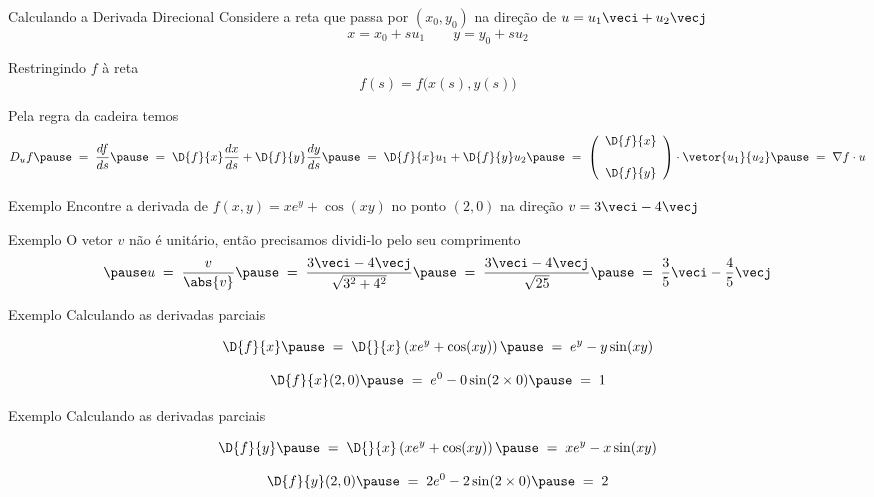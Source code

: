 \begin{frame}{Calculando a Derivada Direcional}
  Considere a reta que passa por \((x_0, y_0)\)
  \pause
  na direção de \(u=u_1\veci+u_2\vecj\)
  \pause
  \[
    x = x_0 + su_1 \qquad
    y = y_0 + su_2
  \]

  Restringindo $f$ à reta
  \[
    f(s) = f\big(x(s), y(s)\big)
  \]

  \pause
  Pela regra da cadeira temos
  \[
    D_u f
    \pause
    \;=\; \frac{df}{ds}
    \pause
    \;=\; \D{f}{x}\frac{dx}{ds} + \D{f}{y}\frac{dy}{ds}
    \pause
    \;=\; \D{f}{x}u_1 + \D{f}{y}u_2
    \pause
    \;=\; \left(\begin{array}{c} \D{f}{x} \\[5mm] \D{f}{y} \end{array}\right)
      \cdot \vetor{u_1}{u_2}
    \pause
    \;=\; \nabla f \cdot u
  \]
\end{frame}

\addtocounter{exemplo}{1}
\begin{frame}{Exemplo \theexemplo}
  Encontre a derivada de \(f(x, y) = xe^y + \cos(xy)\)
  no ponto \((2, 0)\)
  na direção \(v=3\veci-4\vecj\)
\end{frame}

\begin{frame}{Exemplo \theexemplo}
  O vetor $v$ não é unitário,
  \pause
  então precisamos dividi-lo pelo seu
  comprimento
  \[
    \pause
    u
    \;=\; \frac{v}{\abs{v}}
    \pause
    \;=\; \frac{3\veci-4\vecj}{\sqrt{3^2+4^2}}
    \pause
    \;=\; \frac{3\veci-4\vecj}{\sqrt{25}}
    \pause
    \;=\; \frac{3}{5}\veci - \frac{4}{5}\vecj
  \]
\end{frame}

\begin{frame}{Exemplo \theexemplo}
  Calculando as derivadas parciais

  \pause
  \[
    \D{f}{x}
    \pause
    \;=\;  \D{}{x}\left(xe^y + \cos(xy)\right)
    \pause
    \;=\;  e^y - y\sin(xy)
  \]

  \pause
  \[
    \D{f}{x}(2, 0)
    \pause
    \;=\;  e^0 - 0\sin(2\times 0)
    \pause
    \;=\;  1
  \]
\end{frame}

\begin{frame}{Exemplo \theexemplo}
  Calculando as derivadas parciais

  \pause
  \[
    \D{f}{y}
    \pause
    \;=\;  \D{}{x}\left(xe^y + \cos(xy)\right)
    \pause
    \;=\;  xe^y - x\sin(xy)
  \]

  \pause
  \[
    \D{f}{y}(2, 0)
    \pause
    \;=\;  2e^0 - 2\sin(2\times 0)
    \pause
    \;=\;  2
  \]
\end{frame}

